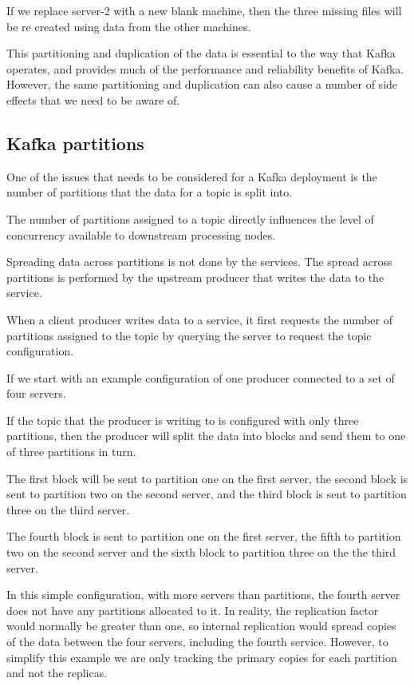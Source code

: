 \documentclass{article}
\begin{document}
If we replace server-2 with a new blank machine, then the three missing files will be re created using data from the other machines.

This partitioning and duplication of the data is essential to the way that Kafka operates,
and provides much of the performance and reliability benefits of Kafka.
However, the same partitioning and duplication can also cause a number of
side effects that we need to be aware of.


\subsection{Kafka partitions}
\label{kafka-partitions}

One of the issues that needs to be considered for a Kafka deployment is the number of partitions that the data for a topic is split into.

The number of partitions assigned to a topic directly influences
the level of concurrency available to downstream processing nodes.

Spreading data across partitions is not done by the services.
The spread across partitions is performed by the upstream producer that writes
the data to the service.

When a client producer writes data to a service, it first requests
the number of partitions assigned to the topic by querying the
server to request the topic configuration.

If we start with an example configuration of one producer connected to
a set of four servers.

If the topic that the producer is writing to is configured with only three partitions,
then the producer will split the data into blocks and send them to one of three
partitions in turn.

The first block will be sent to partition one on the first server, the second block is sent to
partition two on the second server, and the third block is sent to partition three on the third server.

The fourth block is sent to partition one on the first server,
the fifth to partition two on the second server and the sixth block to partition three on the the third server.

In this simple configuration, with more servers than partitions, the fourth server
does not have any partitions allocated to it.
In reality, the replication factor would normally be greater than one, so internal
replication would spread copies of the data between the four servers, including
the fourth service.
However, to simplify this example we are only tracking the primary copies for
each partition and not the replicas.
\end{document}
